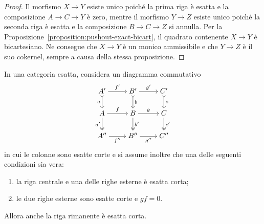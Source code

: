 \begin{proof}
  Il morfismo \(X \to Y\) esiste unico poiché la prima riga è esatta e
  la composizione \(A \to C \to Y\) è zero, mentre il morfismo
  \(Y \to Z\) esiste unico poiché la seconda riga è esatta e la
  composizione \(B \to C \to Z\) si annulla. Per la
  Proposizione~\ref{proposition:pushout-exact-bicart}, il quadrato
  contenente \(X \to Y\) è bicartesiano. Ne consegue che \(X \to Y\) è
  un monico ammissibile e che \(Y \to Z\) è il suo cokernel, sempre a
  causa della stessa proposizione.
\end{proof}

\begin{corollary}
  \label{cor:3x3-lemma}
  In una categoria esatta, considera un diagramma commutativo
  \[
    \begin{tikzcd}[cramped]
      A' \ar["{a}", rightarrowtail, d, swap] \ar["{f'}", r] & B'
      \ar["{b}", rightarrowtail, d]
      \ar["{g'}", r] & C' \ar["{c}", rightarrowtail, d] \\
      A \ar["{a'}", twoheadrightarrow, d, swap] \ar["{f}", r] & B
      \ar["{b'}", twoheadrightarrow, d]
      \ar["{g}", r] & C \ar["{c'}", twoheadrightarrow, d] \\
      A'' \ar["{f''}", r, swap] & B'' \ar["{g''}", r, swap] & C''
    \end{tikzcd}
  \]
  in cui le colonne sono esatte corte e si assume inoltre che una delle
  seguenti condizioni sia vera:
  \begin{enumerate}[label=(\roman*), ref=(\roman*), leftmargin=*]
  \item \label{item:3x3-lemma-1} la riga centrale e una delle righe
    esterne è esatta corta;
  \item \label{item:3x3-lemma-2} le due righe esterne sono esatte corte
    e \(gf = 0\).
  \end{enumerate}
  Allora anche la riga rimanente è esatta corta.
\end{corollary}

